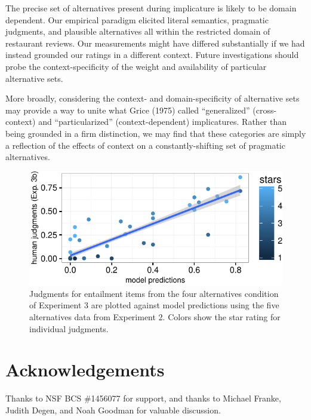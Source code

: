 \documentclass[10pt, letterpaper]{article}
\newenvironment{CodeChunk}{}{}
\begin{document}
The precise set of alternatives present during implicature is likely to
be domain dependent. Our empirical paradigm elicited literal semantics,
pragmatic judgments, and plausible alternatives all within the
restricted domain of restaurant reviews. Our measurements might have
differed substantially if we had instead grounded our ratings in a
different context. Future investigations should probe the
context-specificity of the weight and availability of particular
alternative sets.

More broadly, considering the context- and domain-specificity of
alternative sets may provide a way to unite what Grice (1975) called
``generalized'' (cross-context) and ``particularized''
(context-dependent) implicatures. Rather than being grounded in a firm
distinction, we may find that these categories are simply a reflection
of the effects of context on a constantly-shifting set of pragmatic
alternatives.

\begin{CodeChunk}
\begin{figure}[t]
\includegraphics{figs/fiveAltsScatter-1} \caption[Judgments for entailment items from the four alternatives condition of Experiment 3 are plotted against model predictions using the five alternatives data from Experiment 2]{Judgments for entailment items from the four alternatives condition of Experiment 3 are plotted against model predictions using the five alternatives data from Experiment 2. Colors show the star rating for individual judgments.}\label{fig:fiveAltsScatter}
\end{figure}
\end{CodeChunk}

\section{Acknowledgements}\label{acknowledgements}

Thanks to NSF BCS \#1456077 for support, and thanks to Michael Franke,
Judith Degen, and Noah Goodman for valuable discussion.
\end{document}
